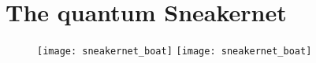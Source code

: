 %
%

\section{The quantum Sneakernet\texttrademark}


\begin{figure}[!htbp]
\pubmode
\texttt{[image: sneakernet\_boat]}
\else
\texttt{[image: sneakernet\_boat]}
\fi
\caption{}\label{fig:sneakernet_boat}	
\end{figure}
